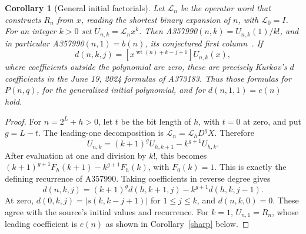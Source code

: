 \documentclass[11pt]{article}
\newcommand{\wt}{\operatorname{wt}}
\newtheorem{corollary}[theorem]{Corollary}
\begin{document}
\begin{corollary}[General initial factorials]\label{initialfactorials}
Let $\mathcal L_n$ be the operator word that constructs $R_n$ from $x$,
reading the shortest binary expansion of $n$, with $\mathcal L_0=I$.
For an integer $k>0$ set $U_{n,k}=\mathcal L_n x^{\overline k}$.
Then A357990$(n,k)=U_{n,k}(1)/k!$, and in particular
A357990$(n,1)=b(n)$, its conjectured first column~\cite{square}.
If
\[
 d(n,k,j)=[x^{\wt(n)+k-j+1}]U_{n,k}(x),
\]
where coefficients outside the polynomial are zero, these are precisely
Kurkov's $d$ coefficients in the June 19, 2024 formulas of A373183.
Thus those formulas for $P(n,q)$, for the generalized initial polynomial,
and for $d(n,1,1)=e(n)$ hold.
\end{corollary}
\begin{proof}
For $n=2^L+h>0$, let $t$ be the bit length of $h$, with $t=0$ at zero,
and put $g=L-t$. The leading-one decomposition is
$\mathcal L_n=\mathcal L_hD^gX$. Therefore
\[
 U_{n,k}=(k+1)^gU_{h,k+1}-k^{g+1}U_{h,k}.
\]
After evaluation at one and division by $k!$, this becomes
$(k+1)^{g+1}F_h(k+1)-k^{g+1}F_h(k)$, with $F_0(k)=1$.
This is exactly the defining recurrence of A357990.
Taking coefficients in reverse degree gives
\[
 d(n,k,j)=(k+1)^gd(h,k+1,j)-k^{g+1}d(h,k,j-1).
\]
At zero, $d(0,k,j)=|s(k,k-j+1)|$ for $1\leq j\leq k$, and
$d(n,k,0)=0$. These agree with the source's initial values and recurrence.
For $k=1$, $U_{n,1}=R_n$, whose leading coefficient is $e(n)$ as shown
in Corollary~\ref{sharp} below.
\end{proof}
\end{document}
